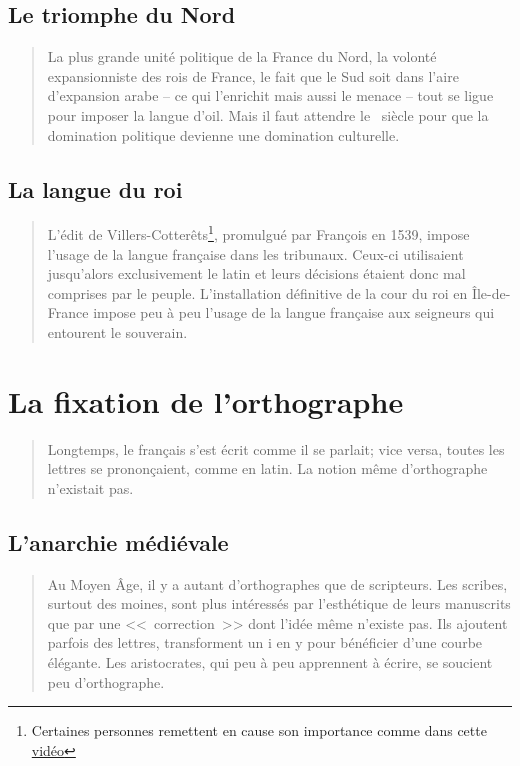 \subsection{Le triomphe du Nord}\label{subsec:trinord}

\begin{quote}
  La plus grande unité politique de la France du Nord, la volonté
  expansionniste des rois de France, le fait que le Sud soit dans
  l'aire d'expansion arabe -- ce qui l'enrichit mais aussi le menace
  -- tout se ligue pour imposer la langue d'oil.
  Mais il faut attendre le \textsc{}~siècle pour
  que la domination politique devienne une domination culturelle.
\end{quote}

\subsection{La langue du roi}\label{subsec:langroy}
\begin{quotation}
  L'édit de Villers-Cotterêts\footnote{Certaines personnes remettent
    en cause son importance comme dans cette \href{https://youtu.be/x3TQkQO_XMc}{vidéo}}, promulgué par François
  {\scshape{}} en 1539, impose l'usage de la langue
  française dans les tribunaux. Ceux-ci utilisaient jusqu'alors
  exclusivement le latin et leurs décisions étaient donc mal comprises
  par le peuple.
  L'installation définitive de la cour du roi en Île-de-France impose
  peu à peu l'usage de la langue française aux seigneurs qui entourent
  le souverain.
\end{quotation}

\section{La fixation de l'orthographe}\label{sec:orthofix}

\begin{quote}
  Longtemps, le français s'est écrit comme il se parlait; vice versa,
  toutes les lettres se prononçaient, comme en latin. La notion même
  d'orthographe n'existait pas.
\end{quote}

\subsection{L'anarchie médiévale}\label{subsec:arnar}

\begin{quotation}
  Au Moyen Âge, il y a autant d'orthographes que de scripteurs. Les
  scribes, surtout des moines, sont plus intéressés par l'esthétique
  de leurs manuscrits que par une <<~correction~>> dont l'idée même
  n'existe pas. Ils ajoutent parfois des lettres, transforment un i en
  y pour bénéficier d'une courbe élégante.
  Les aristocrates, qui peu à peu apprennent à écrire, se soucient peu
  d'orthographe. 
\end{quotation}

